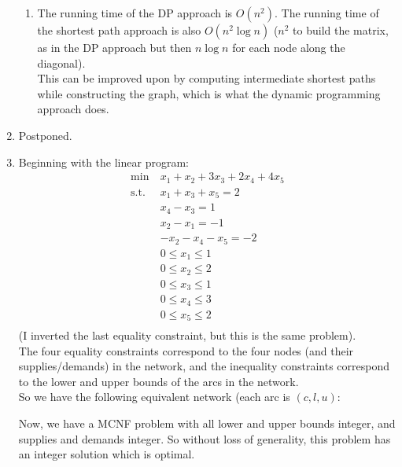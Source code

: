 \documentclass[12pt]{article}
\begin{document}
\begin{enumerate}
\begin{enumerate}
      \item
        The running time of the DP approach is $O(n^2)$. The running time of the
        shortest path approach is also $O(n^2\log n)$ ($n^2$ to build the matrix,
        as in the DP approach but then $n\log n$ for each node along the diagonal).\\
        This can be improved upon by computing intermediate shortest paths while
        constructing the graph, which is what the dynamic programming approach does.\\
    \end{enumerate}
  \item Postponed.
  \item
    Beginning with the linear program:\\
    \begin{equation}
      \begin{split}
        \text{min}\ &x_1+x_2+3x_3+2x_4+4x_5\\
        \text{s.t.}\ &x_1+x_3+x_5=2\\
        &x_4-x_3=1\\
        &x_2-x_1=-1\\
        &-x_2-x_4-x_5=-2\\
        &0\leq x_1\leq1\\
        &0\leq x_2\leq2\\
        &0\leq x_3\leq1\\
        &0\leq x_4\leq3\\
        &0\leq x_5\leq2\\
      \end{split}
    \end{equation}
    (I inverted the last equality constraint, but this is the same problem).\\
    The four equality constraints correspond to the four nodes (and their supplies/demands)
    in the network, and the inequality constraints correspond to the lower and upper bounds
    of the arcs in the network.\\
    So we have the following equivalent network (each arc is $(c,l,u)$:\\
    \begin{center}
    \end{center}

    Now, we have a MCNF problem with all lower and upper bounds integer, and supplies
    and demands integer. So without loss of generality, this problem has an integer
    solution which is optimal.\\
\end{enumerate}
\end{document}
